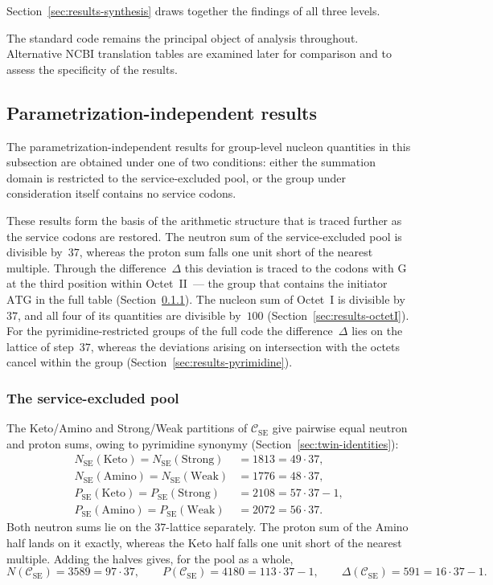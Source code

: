 \documentclass[11pt,a4paper]{article}
\renewcommand{\_}{\origunderscore\allowbreak}
\begin{document}
Section~\ref{sec:results-synthesis} draws together the findings of all
three levels.

The standard code remains the principal object of analysis
throughout. Alternative NCBI translation tables are examined later
for comparison and to assess the specificity of the results.

\subsection{Parametrization-independent results}
\label{sec:results-independent}

The parametrization-independent results for group-level nucleon
quantities in this subsection are obtained under one of two conditions:
either the summation domain is restricted to the service-excluded pool,
or the group under consideration itself contains no service codons.

These results form the basis of the arithmetic structure that is
traced further as the service codons are restored. The neutron sum of the service-excluded pool is divisible by~$37$,
whereas the proton sum falls one unit short of the nearest multiple.
Through the difference~$\Delta$ this deviation is traced to the codons
with $\mathrm{G}$ at the third position within Octet~II~--- the group
that contains the initiator $\mathrm{ATG}$ in the full table
(Section~\ref{sec:results-sensepool}). The nucleon sum of Octet~I is
divisible by~$37$, and all four of its quantities are divisible
by~$100$ (Section~\ref{sec:results-octetI}). For the
pyrimidine-restricted groups of the full code the difference~$\Delta$
lies on the lattice of step~$37$, whereas the deviations arising on
intersection with the octets cancel within the group
(Section~\ref{sec:results-pyrimidine}).

\subsubsection{The service-excluded pool}
\label{sec:results-sensepool}

The Keto/Amino and Strong/Weak partitions of $\mathcal{C}_{\mathrm{SE}}$
give pairwise equal neutron and proton sums, owing to pyrimidine synonymy
(Section~\ref{sec:twin-identities}):
\[
\begin{aligned}
N_{\mathrm{SE}}(\mathrm{Keto}) = N_{\mathrm{SE}}(\mathrm{Strong})
  &= 1813 = 49 \cdot 37, \\
N_{\mathrm{SE}}(\mathrm{Amino}) = N_{\mathrm{SE}}(\mathrm{Weak})
  &= 1776 = 48 \cdot 37, \\
P_{\mathrm{SE}}(\mathrm{Keto}) = P_{\mathrm{SE}}(\mathrm{Strong})
  &= 2108 = 57 \cdot 37 - 1, \\
P_{\mathrm{SE}}(\mathrm{Amino}) = P_{\mathrm{SE}}(\mathrm{Weak})
  &= 2072 = 56 \cdot 37.
\end{aligned}
\]
Both neutron sums lie on the $37$-lattice separately. The proton sum of
the Amino half lands on it exactly, whereas the Keto half falls one unit
short of the nearest multiple. Adding the halves gives, for the pool as a
whole,
\[
N(\mathcal{C}_{\mathrm{SE}}) = 3589 = 97 \cdot 37,
\qquad
P(\mathcal{C}_{\mathrm{SE}}) = 4180 = 113 \cdot 37 - 1,
\qquad
\Delta(\mathcal{C}_{\mathrm{SE}}) = 591 = 16 \cdot 37 - 1.
\]
\end{document}
